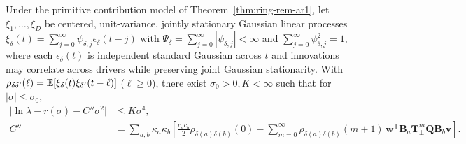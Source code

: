 \begin{theorem}\label{thm:ring-rem-lin}
Under the primitive contribution model of Theorem~\ref{thm:ring-rem-ar1}, let $\xi_1, \dots, \xi_D$ be centered, unit-variance, jointly stationary Gaussian linear processes $\xi_\delta(t) = \sum_{j=0}^{\infty} \psi_{\delta,j}\epsilon_\delta(t - j)$ with $\Psi_\delta = \sum_{j=0}^{\infty} |\psi_{\delta,j}| < \infty$ and $\sum_{j=0}^{\infty} \psi_{\delta,j}^2 = 1$, where each $\epsilon_\delta(t)$ is independent standard Gaussian across $t$ and innovations may correlate across drivers while preserving joint Gaussian stationarity. With $\rho_{\delta\delta'}(\ell) = \mathbb{E}[\xi_\delta(t)\xi_{\delta'}(t - \ell)]$ ($\ell \ge 0$), there exist $\sigma_0 > 0, K < \infty$ such that for $|\sigma| \le \sigma_0$,
\begin{equation}
\begin{aligned}
\bigl|\ln\lambda - r(\sigma) - C''\sigma^2\bigr| &\le K\sigma^4, \\
C'' &= \sum_{a,b} \kappa_a\kappa_b \left[ \frac{c_a c_b}{2}\rho_{\delta(a)\delta(b)}(0) - \sum_{m=0}^{\infty} \rho_{\delta(a)\delta(b)}(m + 1)\,\mathbf{w}^{\mathsf{T}}\mathbf{B}_a\mathbf{T}_\perp^m\mathbf{Q}\mathbf{B}_b\mathbf{v} \right].
\end{aligned}
\label{eq:ring-rem-lin}
\end{equation}
\end{theorem}

